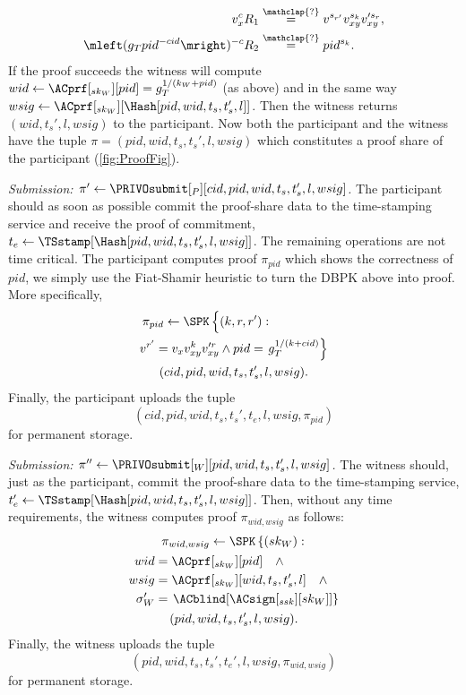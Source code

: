 \begin{align*}
  v_x^c R_1 &\overset{\mathclap{?}}{=} v^{s_{r'}} v_{xy}^{s_k} v_{xy}^{\prime 
    s_r}, \\
  \mleft(g_T pid^{-cid}\mright)^{-c} R_2 &\overset{\mathclap{?}}{=} pid^{s_k}.
\end{align*}
If the proof succeeds the witness will compute \(
  wid\gets \ACprf[_{sk_W}][pid] = g_T^{1/(k_W+pid)}
\) (as above) and in the same way \(
  wsig\gets \ACprf[_{sk_W}][\Hash[pid, wid, t_s, t_s', l]]
\).
Then the witness returns \(
  (wid, t_s', l, wsig)
\) to the participant.
Now both the participant and the witness have the tuple \(
  \pi = (pid, wid, t_s, t_s', l, wsig)
\) which constitutes a proof share of the participant (\cref{fig:ProofFig}).


\emph{Submission: \(\pi'\gets \PRIVOsubmit[_P][cid, pid, wid, t_s, t_s', l, 
    wsig]\).}
The participant should as soon as possible commit the proof-share data to the 
time-stamping service and receive the proof of commitment, \(t_e\gets 
  \TSstamp[\Hash[pid, wid, t_s, t_s', l, wsig]]\).
The remaining operations are not time critical.
The participant computes  proof \(\pi_{pid}\) which shows the 
correctness of \(pid\), \ie we simply use the Fiat-Shamir heuristic to turn the 
\ac{DBPK} above into  proof.
More specifically,
\begin{multline*}
  \pi_{pid}\gets \SPK\left\{(k, r, r') : \phantom{g_T^{1/(k+cid)}}\right. \\
      v^{r'} = v_x v_{xy}^k v_{xy}^{\prime r} \land
      pid = \left. g_T^{1/(k+cid)} \right\} \\
        (cid, pid, wid, t_s, t_s', l, wsig).
\end{multline*}
Finally, the participant uploads the tuple \[
  (cid, pid, wid, t_s, t_s', t_e, l, wsig, \pi_{pid})
\] for permanent storage.

\emph{Submission: \(\pi''\gets \PRIVOsubmit[_W][pid, wid, t_s, t_s', l, 
    wsig]\).}
The witness should, just as the participant, commit the proof-share data to the 
time-stamping service, \(t_e'\gets \TSstamp[\Hash[pid, wid, t_s, t_s', l, 
  wsig]]\).
Then, without any time requirements, the witness computes  proof 
\(\pi_{wid, wsig}\) as follows:
\begin{multline*}
  \pi_{wid, wsig}\gets \SPK\left\{ (sk_W) : \right. \\
    \begin{aligned}
      wid &= \ACprf[_{sk_W}][pid] \quad \land \\
      wsig &= \ACprf[_{sk_W}][wid, t_s, t_s', l] \quad \land \\
      \sigma_W' &= \left. \ACblind[\ACsign[_{ssk}][sk_W]] \right\}
    \end{aligned} \\
      (pid, wid, t_s, t_s', l, wsig).
\end{multline*}
Finally, the witness uploads the tuple \[
  (pid, wid, t_s, t_s', t_e', l, wsig, \pi_{wid, wsig})
\] for permanent storage.


